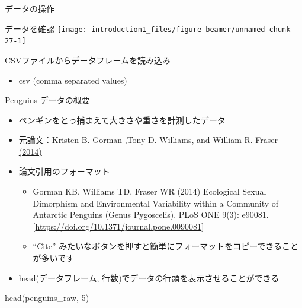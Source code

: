 \documentclass[
  ignorenonframetext,
]{beamer}
\newenvironment{Shaded}{\begin{snugshade}}{\end{snugshade}}
\newcommand{\DecValTok}[1]{\textcolor[rgb]{0.00,0.00,0.81}{#1}}
\newcommand{\FunctionTok}[1]{\textcolor[rgb]{0.00,0.00,0.00}{#1}}
\newcommand{\NormalTok}[1]{#1}
\providecommand{\tightlist}{%
  \setlength{\itemsep}{0pt}\setlength{\parskip}{0pt}}
\begin{document}
\begin{frame}[fragile]{データの操作}
\begin{block}{データを確認}
\protect\hypertarget{ux30c7ux30fcux30bfux3092ux78baux8a8d}{}
\texttt{[image: introduction1\_files/figure-beamer/unnamed-chunk-27-1]}
\end{block}

\begin{block}{CSVファイルからデータフレームを読み込み}
\protect\hypertarget{csvux30d5ux30a1ux30a4ux30ebux304bux3089ux30c7ux30fcux30bfux30d5ux30ecux30fcux30e0ux3092ux8aadux307fux8fbcux307f}{}
\begin{itemize}
\tightlist
\item
  csv (comma separated values)
\end{itemize}
\end{block}

\begin{block}{Penguins データの概要}
\protect\hypertarget{penguins-ux30c7ux30fcux30bfux306eux6982ux8981}{}
\begin{itemize}
\tightlist
\item
  ペンギンをとっ捕まえて大きさや重さを計測したデータ
\item
  元論文：\href{https://journals.plos.org/plosone/article?id=10.1371/journal.pone.0090081}{Kristen
  B. Gorman ,Tony D. Williams, and William R. Fraser (2014)}
\item
  論文引用のフォーマット

  \begin{itemize}
  \tightlist
  \item
    Gorman KB, Williams TD, Fraser WR (2014) Ecological Sexual
    Dimorphism and Environmental Variability within a Community of
    Antarctic Penguins (Genus Pygoscelis). PLoS ONE 9(3): e90081.
    {[}\url{https://doi.org/10.1371/journal.pone.0090081}{]}
  \item
    ``Cite''
    みたいなボタンを押すと簡単にフォーマットをコピーできることが多いです
  \end{itemize}
\item
  head(データフレーム, 行数)でデータの行頭を表示させることができる
\end{itemize}

\begin{Shaded}
\begin{Highlighting}[]
\FunctionTok{head}\NormalTok{(penguins\_raw, }\DecValTok{5}\NormalTok{)}
\end{Highlighting}
\end{Shaded}


\end{block}
\end{frame}
\end{document}
